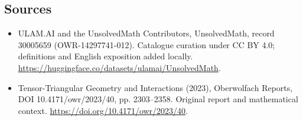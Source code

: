 \documentclass[11pt]{article}
\begin{document}
\subsection{Sources}
\begin{itemize}
\item[\hypertarget{source:30005659:1}{S1}] ULAM.AI and the UnsolvedMath Contributors, UnsolvedMath, record 30005659 (OWR-14297741-012). Catalogue curation under CC BY 4.0; definitions and English exposition added locally.
\url{https://huggingface.co/datasets/ulamai/UnsolvedMath}.
\item[\hypertarget{source:30005659:2}{S2}] Tensor-Triangular Geometry and Interactions (2023), Oberwolfach Reports, DOI 10.4171/owr/2023/40, pp. 2303--2358. Original report and mathematical context.
\url{https://doi.org/10.4171/owr/2023/40}.
\end{itemize}
\label{end:30005659}
\end{document}
